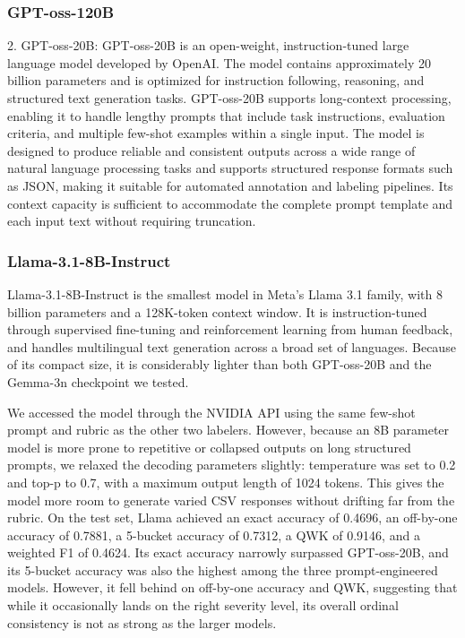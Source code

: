 \documentclass[conference]{IEEEtran}
\begin{document}
\subsubsection{GPT-oss-120B}
2. GPT-oss-20B: GPT-oss-20B \cite{openai2025gptoss} is an open-weight, instruction-tuned large language model developed by OpenAI. The model contains approximately 20 billion parameters and is optimized for instruction following, reasoning, and structured text generation tasks. GPT-oss-20B supports long-context processing, enabling it to handle lengthy prompts that include task instructions, evaluation criteria, and multiple few-shot examples within a single input. The model is designed to produce reliable and consistent outputs across a wide range of natural language processing tasks and supports structured response formats such as JSON, making it suitable for automated annotation and labeling pipelines. Its context capacity is sufficient to accommodate the complete prompt template and each input text without requiring truncation.


\subsubsection{Llama-3.1-8B-Instruct}
Llama-3.1-8B-Instruct \cite{meta2025llama31} is the smallest model in Meta's Llama 3.1 family, with 8 billion parameters and a 128K-token context window. It is instruction-tuned through supervised fine-tuning and reinforcement learning from human feedback, and handles multilingual text generation across a broad set of languages. Because of its compact size, it is considerably lighter than both GPT-oss-20B and the Gemma-3n checkpoint we tested.

We accessed the model through the NVIDIA API using the same few-shot prompt and rubric as the other two labelers. However, because an 8B parameter model is more prone to repetitive or collapsed outputs on long structured prompts, we relaxed the decoding parameters slightly: temperature was set to 0.2 and top-p to 0.7, with a maximum output length of 1024 tokens. This gives the model more room to generate varied CSV responses without drifting far from the rubric. On the test set, Llama achieved an exact accuracy of 0.4696, an off-by-one accuracy of 0.7881, a 5-bucket accuracy of 0.7312, a QWK of 0.9146, and a weighted F1 of 0.4624. Its exact accuracy narrowly surpassed GPT-oss-20B, and its 5-bucket accuracy was also the highest among the three prompt-engineered models. However, it fell behind on off-by-one accuracy and QWK, suggesting that while it occasionally lands on the right severity level, its overall ordinal consistency is not as strong as the larger models.
\end{document}
